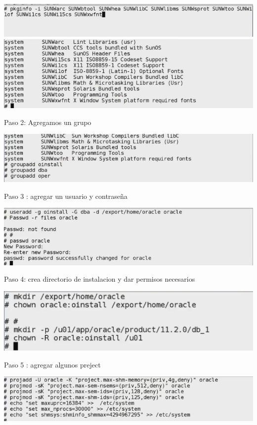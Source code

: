 \documentclass[a4paper,openright,12pt]{book}
\begin{document}
\begin{center}
\includegraphics[width=15cm]{./solari/1.png}
\includegraphics[width=15cm]{./solari/2.png}
\end{center}
Paso 2: Agregamos un grupo
\begin{center}
\includegraphics[width=15cm]{./solari/3.png}
\end{center}
Paso 3 : agregar un usuario y contraseña
\begin{center}
\includegraphics[width=15cm]{./solari/4.png}
\end{center}
Paso 4: crea directorio de instalacion y dar permisos necesarios
\begin{center}
\includegraphics[width=15cm]{./solari/5.png}
\end{center}
Paso 5 : agregar algunos preject
\begin{center}
\includegraphics[width=15cm]{./solari/6.png}
\end{center}
\end{document}
